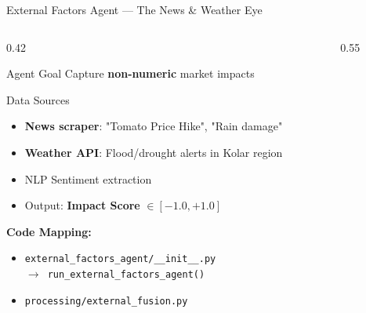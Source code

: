 \documentclass[aspectratio=169]{beamer}
\begin{document}
\begin{frame}{External Factors Agent — The News \& Weather Eye}
\begin{columns}[T]
  \begin{column}{0.42\textwidth}
    \begin{block}{Agent Goal}
      Capture \textbf{non-numeric} market impacts
    \end{block}
    \vspace{0.2cm}
    \begin{block}{Data Sources}
      \begin{itemize}\setlength\itemsep{3pt}
        \item \textbf{News scraper}: "Tomato Price Hike", "Rain damage"
        \item \textbf{Weather API}: Flood/drought alerts in Kolar region
        \item NLP Sentiment extraction
        \item Output: \textbf{Impact Score} $\in [-1.0, +1.0]$
      \end{itemize}
    \end{block}
    \vspace{0.2cm}
    \textbf{Code Mapping:}
    \begin{itemize}
      \item \texttt{external\_factors\_agent/\_\_init\_\_.py}\\
            \texttt{$\to$ run\_external\_factors\_agent()}
      \item \texttt{processing/external\_fusion.py}
    \end{itemize}
  \end{column}
  \begin{column}{0.55\textwidth}
    \centering
\end{column}
\end{columns}
\end{frame}
\end{document}

